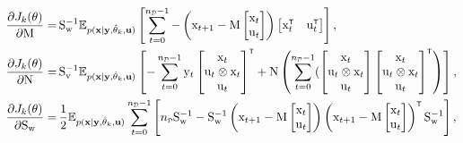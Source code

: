 \begin{align}
        \pdv{J_k(\vctheta)}{\mxM} =& \, \mxS_\vcw^{-1} \mathbb{E}_{p(\mathbf{x}|\mathbf{y},\hat{\vctheta}_k,\mathbf{u})} \left[\sum_{t=0}^{\nD-1} - \left(\vcx_{t+1} - \mxM \begin{bmatrix}\vcx_t\\ \vcu_t \end{bmatrix} \right)\begin{bmatrix}\vcx_t^\tr & \vcu_t^\tr \end{bmatrix}\right], \\
        \pdv{J_k(\vctheta)}{\mxN} =& \, \mxS_\vcv^{-1} \mathbb{E}_{p(\mathbf{x}|\mathbf{y},\hat{\vctheta}_k,\mathbf{u})} \left[-\sum_{t=0}^{\nD-1}  \vcy_t  \begin{bmatrix} \vcx_t\\ \vcu_t \otimes \vcx_t \\ \vcu_t\end{bmatrix}^\tr + \mxN \left(\sum_{t=0}^{\nD-1} ( \begin{bmatrix} \vcx_t\\ \vcu_t \otimes \vcx_t \\ \vcu_t\end{bmatrix} \begin{bmatrix} \vcx_t\\ \vcu_t \otimes \vcx_t \\ \vcu_t\end{bmatrix}^\tr\right)\right],\\
        \pdv{J_k(\vctheta)}{\mxS_\vcw} =& \, \frac{1}{2}\mathbb{E}_{p(\mathbf{x}|\mathbf{y},\hat{\vctheta}_k,\mathbf{u})} \sum_{t=0}^{\nD-1} \left[\nD\mxS_\vcw^{-1} - \mxS_\vcw^{-1} \left(\vcx_{t+1} - \mxM \begin{bmatrix}\vcx_t\\ \vcu_t \end{bmatrix}\right)\left(\vcx_{t+1} - \mxM \begin{bmatrix}\vcx_t\\ \vcu_t \end{bmatrix}\right)^\tr \mxS_\vcw^{-1}\right], \\ 

\end{align}
